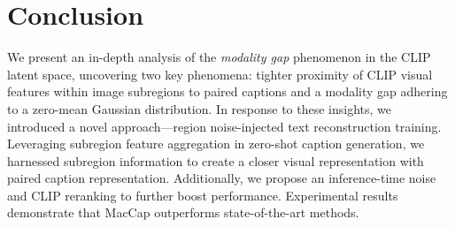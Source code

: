 \section{Conclusion}

We present an in-depth analysis of the \textit{modality gap} phenomenon in the CLIP latent space, uncovering two key phenomena: tighter proximity of CLIP visual features within image subregions to paired captions and a modality gap adhering to a zero-mean Gaussian distribution. In response to these insights, we introduced a novel approach—region noise-injected text reconstruction training. Leveraging subregion feature aggregation in zero-shot caption generation, we harnessed subregion information to create a closer visual representation with paired caption representation. Additionally, we propose an inference-time noise and CLIP reranking to further boost performance. Experimental results demonstrate that MacCap outperforms state-of-the-art methods.
